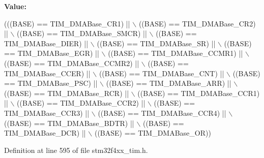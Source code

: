 {\bfseries Value\+:}
\begin{DoxyCode}
(((BASE) == TIM\_DMABase\_CR1) || \(\backslash\)
                               ((BASE) == TIM\_DMABase\_CR2) || \(\backslash\)
                               ((BASE) == TIM\_DMABase\_SMCR) || \(\backslash\)
                               ((BASE) == TIM\_DMABase\_DIER) || \(\backslash\)
                               ((BASE) == TIM\_DMABase\_SR) || \(\backslash\)
                               ((BASE) == TIM\_DMABase\_EGR) || \(\backslash\)
                               ((BASE) == TIM\_DMABase\_CCMR1) || \(\backslash\)
                               ((BASE) == TIM\_DMABase\_CCMR2) || \(\backslash\)
                               ((BASE) == TIM\_DMABase\_CCER) || \(\backslash\)
                               ((BASE) == TIM\_DMABase\_CNT) || \(\backslash\)
                               ((BASE) == TIM\_DMABase\_PSC) || \(\backslash\)
                               ((BASE) == TIM\_DMABase\_ARR) || \(\backslash\)
                               ((BASE) == TIM\_DMABase\_RCR) || \(\backslash\)
                               ((BASE) == TIM\_DMABase\_CCR1) || \(\backslash\)
                               ((BASE) == TIM\_DMABase\_CCR2) || \(\backslash\)
                               ((BASE) == TIM\_DMABase\_CCR3) || \(\backslash\)
                               ((BASE) == TIM\_DMABase\_CCR4) || \(\backslash\)
                               ((BASE) == TIM\_DMABase\_BDTR) || \(\backslash\)
                               ((BASE) == TIM\_DMABase\_DCR) || \(\backslash\)
                               ((BASE) == TIM\_DMABase\_OR))
\end{DoxyCode}


Definition at line 595 of file stm32f4xx\+\_\+tim.\+h.

